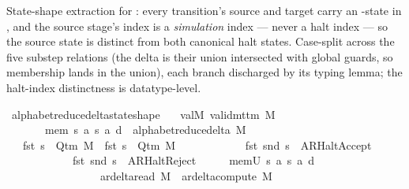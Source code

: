 \begin{isabellebody}
\begin{isamarkuptext}
State-shape extraction for : every
  transition's source and target carry an -state in ,
  and the source stage's index is a \emph{simulation} index — never a
  halt index — so the source state is distinct from both canonical halt
  states.  Case-split across the five substep relations (the delta is
  their union intersected with global guards, so membership lands in the
  union), each branch discharged by its typing lemma; the halt-index
  distinctness is datatype-level.%
\end{isamarkuptext}\isamarkuptrue%
\isamarkupfalse%
\ alphabet{\isacharunderscore}{\kern0pt}reduce{\isacharunderscore}{\kern0pt}delta{\isacharunderscore}{\kern0pt}state{\isacharunderscore}{\kern0pt}shape{\isacharcolon}{\kern0pt}\isanewline
\ \ \ valM{\isacharcolon}{\kern0pt}\ {\isachardoublequoteopen}valid{\isacharunderscore}{\kern0pt}mttm\ M{\isachardoublequoteclose}\isanewline
\ \ \ \ \ \ \ mem{\isacharcolon}{\kern0pt}\ {\isachardoublequoteopen}{\isacharparenleft}{\kern0pt}s{\isacharcomma}{\kern0pt}\ a{\isacharcomma}{\kern0pt}\ s{\isacharprime}{\kern0pt}{\isacharcomma}{\kern0pt}\ a{\isacharprime}{\kern0pt}{\isacharcomma}{\kern0pt}\ d{\isacharparenright}{\kern0pt}\ {\isasymin}\ alphabet{\isacharunderscore}{\kern0pt}reduce{\isacharunderscore}{\kern0pt}delta\ M{\isachardoublequoteclose}\isanewline
\ \ \ {\isachardoublequoteopen}fst\ s\ {\isasymin}\ Q{\isacharunderscore}{\kern0pt}tm\ M\ {\isasymand}\ fst\ s{\isacharprime}{\kern0pt}\ {\isasymin}\ Q{\isacharunderscore}{\kern0pt}tm\ M\isanewline
\ \ \ \ \ \ \ \ \ \ \ {\isasymand}\ fst\ {\isacharparenleft}{\kern0pt}snd\ s{\isacharparenright}{\kern0pt}\ {\isasymnoteq}\ AR{\isacharunderscore}{\kern0pt}HaltAccept\isanewline
\ \ \ \ \ \ \ \ \ \ \ {\isasymand}\ fst\ {\isacharparenleft}{\kern0pt}snd\ s{\isacharparenright}{\kern0pt}\ {\isasymnoteq}\ AR{\isacharunderscore}{\kern0pt}HaltReject{\isachardoublequoteclose}\isanewline
%
\isadelimproof
%
\endisadelimproof
%
\isatagproof
{}\isamarkupfalse%
\ {\isacharminus}{\kern0pt}\isanewline
\ \ \isamarkupfalse%
\ memU{\isacharcolon}{\kern0pt}\ {\isachardoublequoteopen}{\isacharparenleft}{\kern0pt}s{\isacharcomma}{\kern0pt}\ a{\isacharcomma}{\kern0pt}\ s{\isacharprime}{\kern0pt}{\isacharcomma}{\kern0pt}\ a{\isacharprime}{\kern0pt}{\isacharcomma}{\kern0pt}\ d{\isacharparenright}{\kern0pt}\isanewline
\ \ \ \ \ \ \ \ \ \ \ \ \ \ \ \ {\isasymin}\ ar{\isacharunderscore}{\kern0pt}delta{\isacharunderscore}{\kern0pt}read\ M\ {\isasymunion}\ ar{\isacharunderscore}{\kern0pt}delta{\isacharunderscore}{\kern0pt}compute\ M\isanewline

\end{isabellebody}
